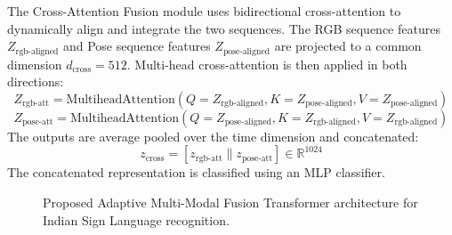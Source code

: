 \documentclass[conference]{IEEEtran}
\begin{document}
The Cross-Attention Fusion module uses bidirectional cross-attention to dynamically align and integrate the two sequences. The RGB sequence features $Z_{\text{rgb-aligned}}$ and Pose sequence features $Z_{\text{pose-aligned}}$ are projected to a common dimension $d_{\text{cross}} = 512$. Multi-head cross-attention is then applied in both directions:
\begin{equation}
Z_{\text{rgb-att}} = \text{MultiheadAttention}(Q=Z_{\text{rgb-aligned}}, K=Z_{\text{pose-aligned}}, V=Z_{\text{pose-aligned}})
\end{equation}
\begin{equation}
Z_{\text{pose-att}} = \text{MultiheadAttention}(Q=Z_{\text{pose-aligned}}, K=Z_{\text{rgb-aligned}}, V=Z_{\text{rgb-aligned}})
\end{equation}
The outputs are average pooled over the time dimension and concatenated:
\begin{equation}
z_{\text{cross}} = [z_{\text{rgb-att}} \parallel z_{\text{pose-att}}] \in \mathbb{R}^{1024}
\end{equation}
The concatenated representation is classified using an MLP classifier.

\begin{figure}[t]
\centering
{}
\caption{Proposed Adaptive Multi-Modal Fusion Transformer architecture for Indian Sign Language recognition.}
\label{fig:architecture}
\end{figure}
\end{document}
